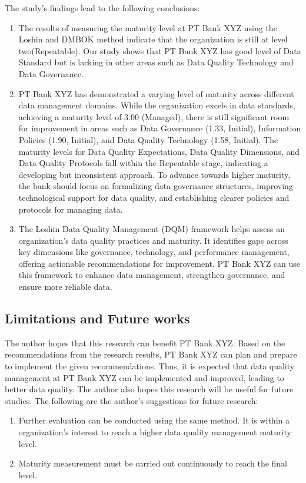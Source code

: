 \documentclass[conference]{IEEEtran}
\begin{document}
The study's findings lead to the following conclusions:

\begin{enumerate}
    \item The results of measuring the maturity level at PT Bank XYZ using the Loshin and DMBOK method \cite{loshin_dqi}\cite{DAMA_2013} indicate that the organization is still at level two(Repeatable). Our study shows that PT Bank XYZ has good level of Data Standard but is lacking in other areas such as Data Quality Technology and Data Governance.
    \item PT Bank XYZ has demonstrated a varying level of maturity across different data management domains. While the organization excels in data standards, achieving a maturity level of 3.00 (Managed), there is still significant room for improvement in areas such as Data Governance (1.33, Initial), Information Policies (1.90, Initial), and Data Quality Technology (1.58, Initial). The maturity levels for Data Quality Expectations, Data Quality Dimensions, and Data Quality Protocols fall within the Repeatable stage, indicating a developing but inconsistent approach. To advance towards higher maturity, the bank should focus on formalizing data governance structures, improving technological support for data quality, and establishing clearer policies and protocols for managing data.
    \item The Loshin Data Quality Management (DQM) framework helps assess an organization's data quality practices and maturity. It identifies gaps across key dimensions like governance, technology, and performance management, offering actionable recommendations for improvement. PT Bank XYZ can use this framework to enhance data management, strengthen governance, and ensure more reliable data.
\end{enumerate}


\subsection{Limitations and Future works}

The author hopes that this research can benefit PT Bank XYZ. Based on the recommendations from the research results, PT Bank XYZ can plan and prepare to implement the given recommendations. Thus, it is expected that data quality management at PT Bank XYZ can be implemented and improved, leading to better data quality. The author also hopes this research will be useful for future studies. The following are the author's suggestions for future research: 
\begin{enumerate}
    \item Further evaluation can be conducted using the same method. It is within a organization's interest to reach a higher data quality management maturity level.
    \item Maturity measurement must be carried out continuously to reach the final level.
\end{enumerate}
\end{document}
